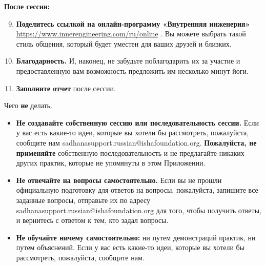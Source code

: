 \textbf{После сессии:}
\begin{enumerate}
    \setcounter{enumi}{8}
\item \textbf{Поделитесь ссылкой на онлайн-программу «Внутренняя инженерия»}
  \href{https://www.innerengineering.com/ru/online}{https://www.innerengineering.com/ru/online} \faSmileO. Вы можете выбрать такой стиль общения, который будет уместен для ваших друзей и близких.
    \item \textbf{Благодарность.} И, наконец, не забудьте поблагодарить их за участие и предоставленную вам возможность предложить им несколько минут йоги.
    \item \textbf{Заполните \href{https://forms.gle/q1N7jG4vBEWBmng86}{отчет}} после сессии. 
\end{enumerate}

Чего \textbf{не} делать.
\begin{itemize}
    \item[\faRemove] \textbf{Не создавайте собственную сессию или последовательность сессии.} Если у вас есть какие-то идеи, которые вы хотели бы рассмотреть, пожалуйста, сообщите нам sadhanasupport.russian@ishafoundation.org. \textbf{Пожалуйста, не применяйте} собственную последовательность и не предлагайте никаких других практик, которые не упомянуты в этом Приложении.
    \item[\faRemove] \textbf{Не отвечайте на вопросы самостоятельно.} Если вы не прошли официальную подготовку для ответов на вопросы, пожалуйста, запишите все заданные вопросы, отправьте их по адресу sadhanasupport.russian@ishafoundation.org для того, чтобы получить ответы, и вернитесь с ответом к тем, кто задал вопросы.
    \item[\faRemove] \textbf{Не обучайте ничему самостоятельно:} ни путем демонстраций практик, ни путем объяснений. Если у вас есть какие-то идеи, которые вы хотели бы
рассмотреть, пожалуйста, сообщите нам.
\end{itemize}

